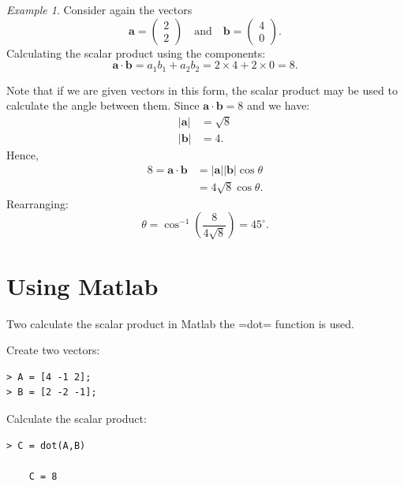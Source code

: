 \documentclass[12pt,a4paper]{article}
\theoremstyle{definition}
\theoremstyle{remark}
\newtheorem{example}[proposition]{Example}
\newcommand{\bvec}[1]{\mathrm{\mathbf{#1}}}
\newcommand{\cvec}[2]{\begin{pmatrix} #1 \\ #2 \end{pmatrix}}
\newcommand{\vmod}[1]{{\lvert {#1} \rvert}}
\begin{document}
\begin{example}
Consider again the vectors
\[
\bvec{a} = \cvec{2}{2} \quad \text{and} \quad \bvec{b} = \cvec{4}{0}.
\]
Calculating the scalar product using the components:
\[
\bvec{a} \cdot \bvec{b} = a_1b_1 + a_2b_2 = 2\times 4 + 2\times 0 = 8. 
\]

Note that if we are given vectors in this form, the scalar product may be used to calculate the angle between them. Since \(\bvec{a} \cdot \bvec{b} = 8\) and we have:
\begin{align*}
\vmod{\bvec{a}} &= \sqrt{8}\\
\vmod{\bvec{b}} &= 4.
\end{align*}
Hence,
\begin{align*}
8 = \bvec{a} \cdot \bvec{b} &= \vmod{\bvec{a}}\vmod{\bvec{b}}\cos\theta\\
\,&= 4\sqrt{8}\cos \theta.
\end{align*}
Rearranging:
\[
\theta = \cos^{-1}\left(\frac{8}{4\sqrt{8}}\right) = {45}^{\circ}.
\]
\end{example}

\section{Using Matlab}

Two calculate the scalar product in Matlab the \spverb=dot= function is used. 

Create two vectors:
\begin{lstlisting}
> A = [4 -1 2];
> B = [2 -2 -1];
\end{lstlisting}

Calculate the scalar product:
\begin{lstlisting}
> C = dot(A,B)
    
    C = 8
\end{lstlisting}
\end{document}
